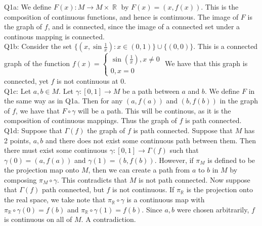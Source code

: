 \documentclass[letterpaper]{article}
\DeclareMathOperator{\R}{\mathbb{R}}
\begin{document}
\noindent Q1a: We define $F(x):M\rightarrow M\times \R$ by $F(x) = (x,f(x))$. This is the composition of continuous functions, and hence is continuous. The image of $F$ is the graph of $f$, and is connected, since the image of a connected set under a continous mapping is connected.
\newline \\ Q1b: Consider the set $\{(x,\sin{\frac{1}{x}}) : x\in(0,1)\} \cup \{(0,0) \}$. This is a connected graph of the function $f(x) = \begin{cases}
    \sin(\frac{1}{x}), x\neq 0  \\ 0 , x=0
\end{cases}  $ We have that this graph is connected, yet $f$ is not continuous at $0$. 
\newline \\ Q1c: Let $a,b\in M$. Let $\gamma:[0,1]\to M$ be a path between $a$ and $b$. We define $F$ in the same way as in Q1a. Then for any $(a,f(a))$ and $(b,f(b))$ in the graph of $f$, we have that $F\circ \gamma$ will be a path. This will be continous, as it is the composition of continuous mappings. Thus the graph of $f$ is path connected. 
\newline \\ Q1d: Suppose that $\Gamma(f)$ the graph of $f$ is path connected. Suppose that $M$ has 2 points, $a,b$ and there does not exist some continuous path between them. Then there must exist some continuous $\gamma:[0,1]\to \Gamma(f)$ such that $\gamma(0)=(a,f(a))$ and $\gamma(1) = (b,f(b))$. However, if $\pi_M$ is defined to be the projection map onto $M$, then we can create a path from $a$ to $b$ in $M$ by composing $\pi_M \circ \gamma$. This contradicts that $M$ is not path connected. Now suppose that $\Gamma(f)$ path connected, but $f$ is not continuous.
If $\pi_{\R}$ is the projection onto the real space, we take note that $\pi_{\R} \circ \gamma$ is a continuous map with $\pi_{\R} \circ \gamma(0)=f(b)$ and $\pi_{\R} \circ \gamma(1)=f(b)$. Since $a,b$ were chosen arbitrarily, $f$ is continuous on all of $M$. A contradiction. 
\end{document}
